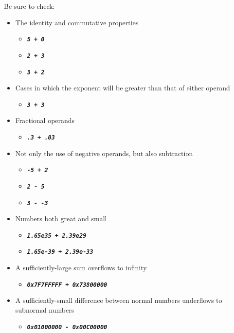 Be sure to check:
\begin{itemize}
    \item The identity and commutative properties
    \begin{itemize}
        \item[] \texttt{\textbf{\textit{5 + 0}}}
        \item[] \texttt{\textbf{\textit{2 + 3}}}
        \item[] \texttt{\textbf{\textit{3 + 2}}}
    \end{itemize}
    \item Cases in which the exponent will be greater than that of either operand
    \begin{itemize}
        \item[] \texttt{\textbf{\textit{3 + 3}}}
    \end{itemize}
    \item Fractional operands
    \begin{itemize}
        \item[] \texttt{\textbf{\textit{.3 + .03}}}
    \end{itemize}
    \item Not only the use of negative operands, but also subtraction
    \begin{itemize}
        \item[] \texttt{\textbf{\textit{-5 + 2}}}
        \item[] \texttt{\textbf{\textit{2 - 5}}}
        \item[] \texttt{\textbf{\textit{3 - -3}}}
    \end{itemize}
    \item Numbers both great and small
    \begin{itemize}
        \item[] \texttt{\textbf{\textit{1.65e35 + 2.39e29}}}
        \item[] \texttt{\textbf{\textit{1.65e-39 + 2.39e-33}}}
    \end{itemize}
    \item A sufficiently-large sum overflows to infinity
    \begin{itemize}
        \item[] \texttt{\textbf{\textit{0x7F7FFFFF + 0x73800000}}}
    \end{itemize}
    \item A sufficiently-small difference between normal numbers underflows to subnormal numbers
    \begin{itemize}
        \item[] \texttt{\textbf{\textit{0x01000000 - 0x00C00000}}}

\end{itemize}
\end{itemize}
